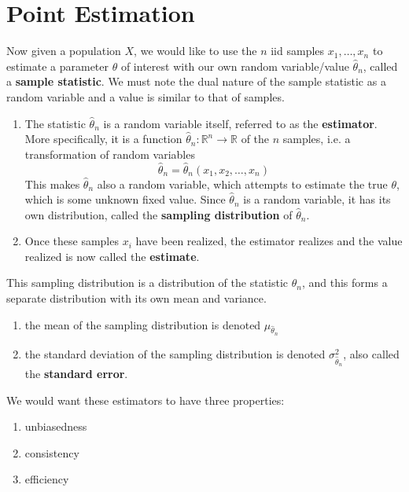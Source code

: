 \section{Point Estimation}

  \begin{definition}
    Now given a population $X$, we would like to use the $n$ iid samples $x_1, \ldots, x_n$ to estimate a parameter $\theta$ of interest with our own random variable/value $\widehat{\theta}_n$, called a \textbf{sample statistic}. We must note the dual nature of the sample statistic as a random variable and a value is similar to that of samples. 
    \begin{enumerate}
      \item The statistic $\widehat{\theta}_n$ is a random variable itself, referred to as the \textbf{estimator}. More specifically, it is a function $\widehat{\theta}_n: \mathbb{R}^n \longrightarrow \mathbb{R}$ of the $n$ samples, i.e. a transformation of random variables 
      \begin{equation}
        \widehat{\theta}_n = \widehat{\theta}_n (x_1, x_2, \ldots, x_n)
      \end{equation}
      This makes $\widehat{\theta}_n$ also a random variable, which attempts to estimate the true $\theta$, which is some unknown fixed value. Since $\widehat{\theta}_n$ is a random variable, it has its own distribution, called the \textbf{sampling distribution} of $\widehat{\theta}_n$. 
      
      \item Once these samples $x_i$ have been realized, the estimator realizes and the value realized is now called the \textbf{estimate}. 
    \end{enumerate}
    This sampling distribution is a distribution of the statistic $\widehat{\theta}_n$, and this forms a separate distribution with its own mean and variance. 
    \begin{enumerate}
      \item the mean of the sampling distribution is denoted $\mu_{\widehat{\theta}_n}$
      \item the standard deviation of the sampling distribution is denoted $\sigma^2_{\widehat{\theta}_n}$, also called the \textbf{standard error}. 
    \end{enumerate}
  \end{definition}

  We would want these estimators to have three properties: 
  \begin{enumerate}
    \item unbiasedness
    \item consistency 
    \item efficiency
  \end{enumerate}

